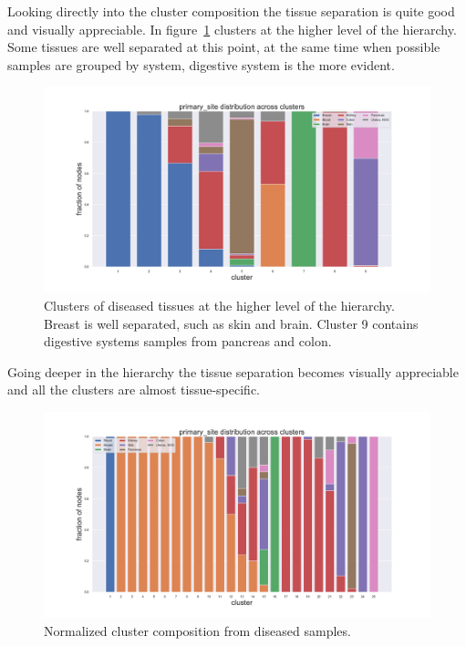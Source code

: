 Looking directly into the cluster composition the tissue separation is quite good and visually appreciable. In figure~\ref{fig:topic/tcga/fraction_clustercomposition_l4_primary_site} clusters at the higher level of the hierarchy. Some tissues are well separated at this point, at the same time when possible samples are grouped by system, digestive system is the more evident.
\begin{figure}[htb!]
	\centering
	\includegraphics[width=0.8\linewidth]{pictures/topic/tcga/fraction_clustercomposition_l4_primary_site.pdf}
	\caption{Clusters of diseased tissues at the higher level of the hierarchy. Breast is well separated, such as skin and brain. Cluster 9 contains digestive systems samples from pancreas and colon.}
	\label{fig:topic/tcga/fraction_clustercomposition_l4_primary_site}
\end{figure}
Going deeper in the hierarchy the tissue separation becomes visually appreciable and all the clusters are almost tissue-specific.
\begin{figure}[htb!]
	\centering
	\includegraphics[width=0.8\linewidth]{pictures/topic/tcga/fraction_clustercomposition_l3_primary_site.pdf}
	\caption{Normalized cluster composition from diseased samples.}
	\label{fig:topic/tcga/fraction_clustercomposition_l3_primary_site}
\end{figure}

